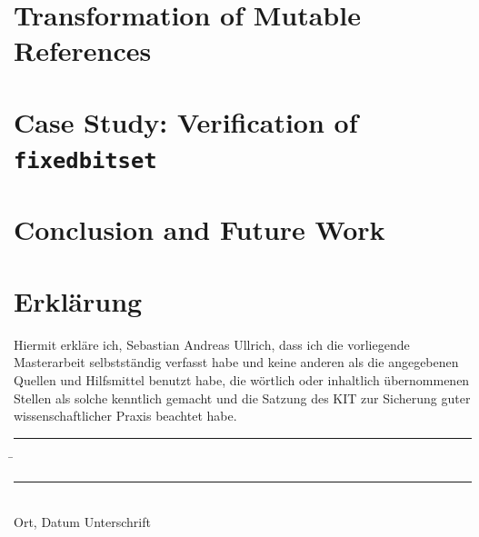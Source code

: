\documentclass[12pt,a4paper,twoside]{article}
\begin{document}
\cleardoublepage
\pagestyle{fancy}
\fancyhf{}
\fancyhead[LE,RO]{\thepage}
\fancyhead[RE,LO]{\textit\leftmark}


\newpage

\newpage

\newpage


\newpage


\newpage
\section{Transformation of Mutable References}
\label{sec:mutref}

\section{Case Study: Verification of \texttt{fixedbitset}}
\label{sec:fixedbitset}

\section{Conclusion and Future Work}

\newpage



\cleardoublepage
\pagestyle{empty}
\section*{Erklärung}

  \vspace{20mm}
  Hiermit erkläre ich, Sebastian Andreas Ullrich, dass ich die vorliegende Masterarbeit selbst\-ständig
verfasst habe und keine anderen als die angegebenen Quellen und Hilfsmittel
benutzt habe, die wörtlich oder inhaltlich übernommenen Stellen als solche kenntlich gemacht und
die Satzung des KIT zur Sicherung guter wissenschaftlicher Praxis beachtet habe.
  \vspace{20mm}
  \begin{tabbing}
  \rule{4cm}{.4pt}\hspace{1cm} \= \rule{7cm}{.4pt} \\
 Ort, Datum \> Unterschrift
  \end{tabbing}
\end{document}
